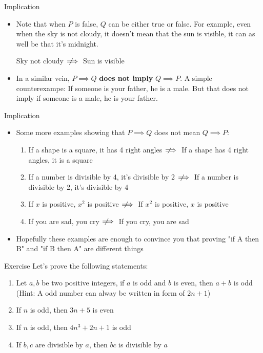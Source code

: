 \documentclass[10pt,xcolor={table,dvipsnames},t]{beamer}
\begin{document}
\begin{frame}{Implication}
  \begin{itemize}
    \item Note that when $P$ is false, $Q$ can be either true or false. For example, even when the sky is not cloudy, it doesn't mean that the sun is visible, it can as well be that it's midnight.
    \begin{center}
      Sky not cloudy $\;\not\!\!\!\implies$ Sun is visible
    \end{center}
    \item In a similar vein, $P\implies Q$ \textbf{does not imply} $Q\implies P$. A simple counterexampe: If someone is your father, he is a male. But that does not imply if someone is a male, he is your father.
  \end{itemize}
\end{frame}

\begin{frame}{Implication}
  \begin{itemize}
    \item Some more examples showing that $P\implies Q$ does not mean $Q\implies P$:
    \begin{enumerate}
      \item If a shape is a square, it has 4 right angles $\;\not\!\!\!\implies$ If a shape has 4 right angles, it is a square
      \item If a number is divisible by 4, it's divisible by 2 $\;\not\!\!\!\implies$ If a number is divisible by 2, it's divisible by 4
      \item If $x$ is positive, $x^2$ is positive $\;\not\!\!\!\implies$ If $x^2$ is positive, $x$ is positive
      \item If you are sad, you cry $\;\not\!\!\!\implies$ If you cry, you are sad
    \end{enumerate}
    \item Hopefully these examples are enough to convince you that proving "if A then B" and "if B then A" are different things
  \end{itemize}
\end{frame}

\begin{frame}{Exercise}
  Let's prove the following statements:
  \begin{enumerate}
    \item Let $a,b$ be two positive integers, if $a$ is odd and $b$ is even, then $a+b$ is odd (Hint: A odd number can alway be written in form of $2n+1$) 
    \item If $n$ is odd, then $3n+5$ is even
    \item If $n$ is odd, then $4n^3 + 2n+1$ is odd
    \item If $b,c$ are divisible by $a$, then $bc$ is divisible by $a$
  \end{enumerate}
\end{frame}
\end{document}
